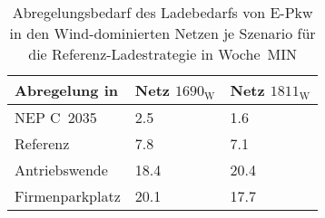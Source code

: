 {
\renewcommand{\arraystretch}{1.2}%
\begin{table}[H]
	\begin{center}
		\caption{Abregelungsbedarf des Ladebedarfs von E-Pkw in den Wind-dominierten Netzen je Szenario für die Referenz-Ladestrategie in Woche~MIN}
		\begin{tabu} to 0.6\textwidth {X[1.5] X[1, r] X[1, r]}
			\toprule
			Abregelung in   \si{\mwh}    & Netz \(1690_{\text{W}}\) & Netz \(1811_{\text{W}}\) \\ \midrule
			NEP C~\num{2035}             & \num{2.5}       & \num{1.6}       \\
			Referenz                     & \num{7.8}       & \num{7.1}       \\
			Antriebswende                & \num{18.4}      & \num{20.4}      \\
			\glqq Firmenparkplatz\grqq{} & \num{20.1}      & \num{17.7}      \\ \bottomrule
		\end{tabu}
		\label{tab:wind_dominated_week_a_epkw_cur}
	\end{center}
	\vspace{-3mm}%
\end{table}
}